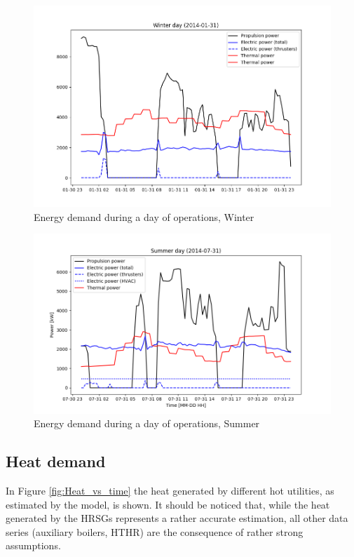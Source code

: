 \documentclass[preprint,12pt]{elsarticle}
\begin{document}
\begin{figure}
	\centering
	\includegraphics[width=0.9\linewidth]{Figures/Demand_vs_time_W}
	\caption{Energy demand during a day of operations, Winter}
	\label{fig:Demand_vs_time_W}
\end{figure}

\begin{figure}
	\centering
	\includegraphics[width=0.9\linewidth]{Figures/Demand_vs_time_S}
	\caption{Energy demand during a day of operations, Summer}
	\label{fig:Demand_vs_time_S}
\end{figure}

\subsection{Heat demand} \label{sec:res:heat}

In Figure \ref{fig:Heat_vs_time} the heat generated by different hot utilities, as estimated by the model, is shown. It should be noticed that, while the heat generated by the HRSGs represents a rather accurate estimation, all other data series (auxiliary boilers, HTHR) are the consequence of rather strong assumptions. 
\end{document}
